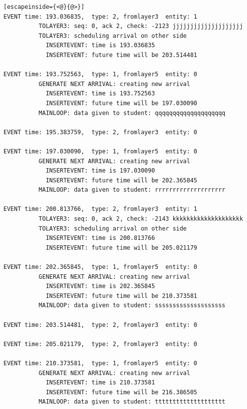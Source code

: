 \documentclass[paper=a4, fontsize=11pt]{scrartcl}
\numberwithin{equation}{section}		%
\numberwithin{figure}{section}			%
\numberwithin{table}{section}				%
\begin{document}
\begin{lstlisting}[escapeinside={<@}{@>}]
EVENT time: 193.036835,  type: 2, fromlayer3  entity: 1
          TOLAYER3: seq: 0, ack 2, check: -2123 jjjjjjjjjjjjjjjjjjjj
          TOLAYER3: scheduling arrival on other side
            INSERTEVENT: time is 193.036835
            INSERTEVENT: future time will be 203.514481

EVENT time: 193.752563,  type: 1, fromlayer5  entity: 0
          GENERATE NEXT ARRIVAL: creating new arrival
            INSERTEVENT: time is 193.752563
            INSERTEVENT: future time will be 197.030090
          MAINLOOP: data given to student: qqqqqqqqqqqqqqqqqqqq

EVENT time: 195.383759,  type: 2, fromlayer3  entity: 0

EVENT time: 197.030090,  type: 1, fromlayer5  entity: 0
          GENERATE NEXT ARRIVAL: creating new arrival
            INSERTEVENT: time is 197.030090
            INSERTEVENT: future time will be 202.365845
          MAINLOOP: data given to student: rrrrrrrrrrrrrrrrrrrr

EVENT time: 200.813766,  type: 2, fromlayer3  entity: 1
          TOLAYER3: seq: 0, ack 2, check: -2143 kkkkkkkkkkkkkkkkkkkk
          TOLAYER3: scheduling arrival on other side
            INSERTEVENT: time is 200.813766
            INSERTEVENT: future time will be 205.021179

EVENT time: 202.365845,  type: 1, fromlayer5  entity: 0
          GENERATE NEXT ARRIVAL: creating new arrival
            INSERTEVENT: time is 202.365845
            INSERTEVENT: future time will be 210.373581
          MAINLOOP: data given to student: ssssssssssssssssssss

EVENT time: 203.514481,  type: 2, fromlayer3  entity: 0

EVENT time: 205.021179,  type: 2, fromlayer3  entity: 0

EVENT time: 210.373581,  type: 1, fromlayer5  entity: 0
          GENERATE NEXT ARRIVAL: creating new arrival
            INSERTEVENT: time is 210.373581
            INSERTEVENT: future time will be 216.386505
          MAINLOOP: data given to student: tttttttttttttttttttt


\end{lstlisting}
\end{document}
